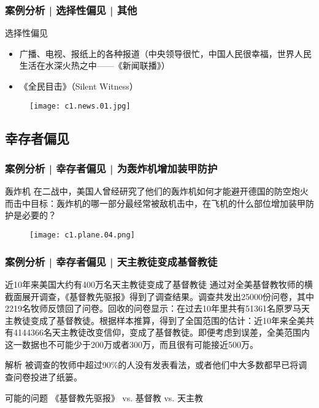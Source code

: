 \begin{frame}
  \frametitle{案例分析 | 选择性偏见 | 其他}
  \begin{block}{选择性偏见}
    \begin{itemize}
      \item 广播、电视、报纸上的各种报道（中央领导很忙，中国人民很幸福，世界人民生活在水深火热之中——《新闻联播》）
      \item 《全民目击》（Silent Witness）
    \end{itemize}
    \vspace{-1em}
    \begin{figure}
      \centering
      \texttt{[image: c1.news.01.jpg]}
    \end{figure}
  \end{block}
\end{frame}

\subsection{幸存者偏见}
\begin{frame}
  \frametitle{案例分析 | 幸存者偏见 | 为轰炸机增加装甲防护}
  \begin{block}{轰炸机}
在二战中，美国人曾经研究了他们的轰炸机如何才能避开德国的防空炮火而击中目标：轰炸机的哪一部分最经常被敌机击中，在飞机的什么部位增加装甲防护是必要的？
  \end{block}
  \begin{figure}
    \centering
    \texttt{[image: c1.plane.04.png]}
  \end{figure}
\end{frame}

\begin{frame}
  \frametitle{案例分析 | 幸存者偏见 | 天主教徒变成基督教徒}
  \begin{block}{近10年来美国大约有400万名天主教徒变成了基督教徒}
通过对全美基督教牧师的横截面展开调查，《基督教先驱报》得到了调查结果。调查共发出25000份问卷，其中2219名牧师反馈回了问卷。回收的问卷显示：在过去10年里共有51361名原罗马天主教徒变成了基督教徒。根据样本推算，得到了全国范围的估计：近10年来全美共有4144366名天主教徒改变信仰，变成了基督教徒。即便考虑到误差，全美范围内这一数据也不可能少于200万或者300万，而且很有可能接近500万。
  \end{block}
  \pause \pause \pause \pause
  \begin{block}{解析}
    被调查的牧师中超过90\%的人没有发表看法，或者他们中大多数都早已将调查问卷投进了纸篓。
  \end{block}
  \pause
  \begin{block}{可能的问题}
    《基督教先驱报》 vs. 基督教 vs. 天主教
  \end{block}
\end{frame}

